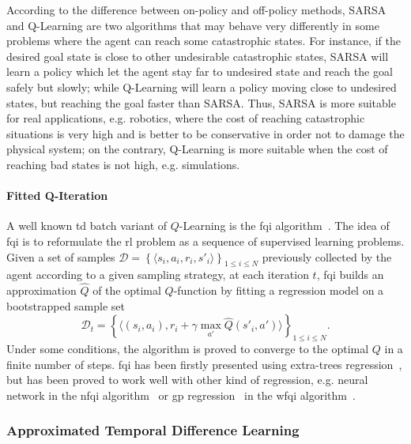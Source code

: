According to the difference between on-policy and off-policy methods, SARSA and Q-Learning are two algorithms that may behave very differently in some problems where the agent can reach some catastrophic states. For instance, if the desired goal state is close to other undesirable catastrophic states, SARSA will learn a policy which let the agent stay far to undesired state and reach the goal safely but slowly; while Q-Learning will learn a policy moving close to undesired states, but reaching the goal faster than SARSA. Thus, SARSA is more suitable for real applications, e.g. robotics, where the cost of reaching catastrophic situations is very high and is better to be conservative in order not to damage the physical system; on the contrary, Q-Learning is more suitable when the cost of reaching bad states is not high, e.g. simulations.

\paragraph{Fitted Q-Iteration}\label{S:FQI}
A well known \gls{td} batch variant of $Q$-Learning is the \gls{fqi} algorithm~\cite{ernst2005tree}. The idea of \gls{fqi} is to reformulate the \gls{rl} problem as a sequence of supervised learning problems. Given a set of samples $\mathcal{D} = \left\{\langle s_i, a_i, r_i, s'_i \rangle \right\}_{1\leq i\leq N}$ previously collected by the agent according to a given sampling strategy, at each iteration $t$, \gls{fqi} builds an approximation $\hat{Q}$ of the optimal $Q$-function by fitting a regression model on a bootstrapped sample set
\begin{equation}
 \mathcal{D}_t = \left\{ \langle (s_i,a_i), r_i + \gamma \max_{a'} \hat{Q}\left(s'_i, a'\right) \rangle\right\}_{1 \leq i \leq N}.
\end{equation}
Under some conditions, the algorithm is proved to converge to the optimal $Q$ in a finite number of steps. \gls{fqi} has been firstly presented using extra-trees regression~\cite{geurts2006extremely}, but has been proved to work well with other kind of regression, e.g. neural network in the \gls{nfqi} algorithm~\cite{riedmiller2005neural} or \gls{gp} regression~\cite{rasmussen2005gaussian} in the \gls{wfqi} algorithm~\cite{deramo2017maximum}.

\subsubsection{Approximated Temporal Difference Learning}

